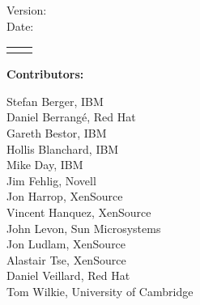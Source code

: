 %
%
%
%

\pagestyle{empty}

\doctitle{} \hfill \revstring{}

\vspace{1cm}

\begin{center}

\vspace{2cm}

\begin{Huge}
  \doctitle{}
\end{Huge}

\vspace{1cm}
\begin{Large}
Version: \revstring{}\\
Date: \datestring{}
\\
\releasestatement{}

\vspace{1cm}
\begin{tabular}{rl}
\docauthors{}
\end{tabular}
\end{Large}
\end{center}
\vspace{.5cm}
\begin{large}
\textbf{Contributors:}
\begin{multicols}{2}{
Stefan Berger, IBM \\
Daniel Berrang\'e, Red Hat \\
Gareth Bestor, IBM \\
Hollis Blanchard, IBM \\
Mike Day, IBM \\
Jim Fehlig, Novell \\
Jon Harrop, XenSource \\
Vincent Hanquez, XenSource \\
John Levon, Sun Microsystems \\
Jon Ludlam, XenSource \\
Alastair Tse, XenSource \\
Daniel Veillard, Red Hat \\
Tom Wilkie, University of Cambridge}
\end{multicols}
\end{large}

\vfill

\noindent
\legalnotice{}

\newpage
\pagestyle{fancy}